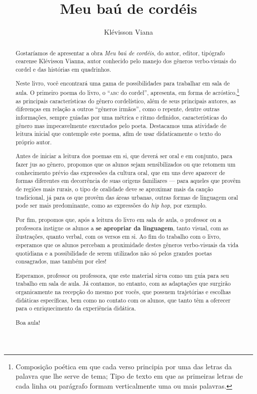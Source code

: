 \documentclass[11pt]{extarticle}
\newcommand{\AutorLivro}{Klévisson Viana}
\newcommand{\TituloLivro}{Meu baú de cordéis}
\newcommand{\colaborador}{Renier Silva}
\begin{document}
\title{\TituloLivro}
\author{\AutorLivro}
\def\authornotes{\colaborador}

\date{}
\maketitle


\tableofcontents


\begin{abstract}
Gostaríamos de apresentar a obra \textit{Meu baú de cordéis}, do autor, editor,
tipógrafo cearense Klévisson Vianna, autor conhecido pelo manejo dos gêneros verbo-visuais
do cordel e das histórias em quadrinhos.

Neste livro, você encontrará uma gama de possibilidades para trabalhar em sala de 
aula. O primeiro poema do livro, o ``\textsc{abc} do cordel'', apresenta, 
em forma de acróstico,\footnote{Composição poética em que cada verso principia por uma das letras da palavra que lhe serve de tema; Tipo de texto em que as primeiras letras de cada linha ou parágrafo formam verticalmente uma ou mais palavras.} as principais características do gênero cordelístico,
além de seus principais autores, as diferenças em relação a outros ``gêneros irmãos'',
como o repente, dentre outras informações, sempre guiadas por uma métrica e ritmo
definidos, características do gênero mas impecavelmente executados pelo poeta. 
Destacamos uma atividade de leitura inicial que contemple este poema, afim de
usar didaticamente o texto do próprio autor. 

Antes de iniciar a leitura dos poemas em si, que deverá ser oral e em conjunto,
para fazer jus ao gênero, propomos que os alunos sejam sensibilizados 
ou que retomem um conhecimento prévio das expressões da cultura oral,
que em uns deve aparecer de formas diferentes em decorrência de suas origens 
familiares --- para aqueles que provêm de regiões mais rurais,
o tipo de oralidade deve se aproximar mais da canção tradicional,
já para os que provêm das áreas urbanas, outras formas de linguagem
oral pode ser mais predominante, como as expressões do \textit{hip hop},
por exemplo. 

Por fim, propomos que, após a leitura do livro em sala de aula, 
o professor ou a professora instigue os alunos a \textbf{se apropriar da linguagem},
tanto visual, com as ilustrações, quanto verbal, com os versos em si. 
Ao fim do trabalho com o livro, esperamos que os alunos percebam a proximidade
destes gêneros verbo-visuais da vida quotidiana e a possibilidade de 
serem utilizados não só pelos grandes poetas consagrados, mas também por eles!

Esperamos, professor ou professora, que este material sirva como um guia 
para seu trabalho em sala de aula. Já contamos, no entanto, com as adaptações
que surgirão organicamente na recepção do mesmo por vocês, que possuem 
trajetórias e escolhas didáticas específicas, bem como no contato com os 
alunos, que tanto têm a oferecer para o enriquecimento da experiência didática. 

Boa aula!
\end{abstract}
\end{document}
